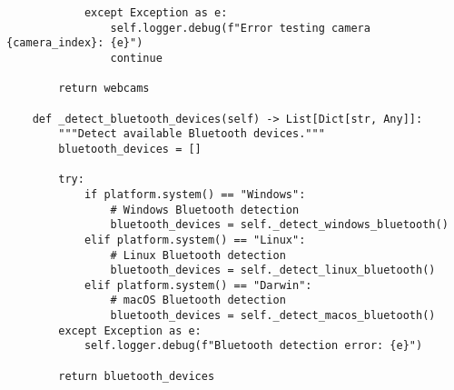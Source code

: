 \documentclass[12pt,a4paper]{article}
\begin{document}
\begin{verbatim}
            except Exception as e:
                self.logger.debug(f"Error testing camera {camera_index}: {e}")
                continue
        
        return webcams
    
    def _detect_bluetooth_devices(self) -> List[Dict[str, Any]]:
        """Detect available Bluetooth devices."""
        bluetooth_devices = []
        
        try:
            if platform.system() == "Windows":
                # Windows Bluetooth detection
                bluetooth_devices = self._detect_windows_bluetooth()
            elif platform.system() == "Linux":
                # Linux Bluetooth detection
                bluetooth_devices = self._detect_linux_bluetooth()
            elif platform.system() == "Darwin":
                # macOS Bluetooth detection
                bluetooth_devices = self._detect_macos_bluetooth()
        except Exception as e:
            self.logger.debug(f"Bluetooth detection error: {e}")
        
        return bluetooth_devices
    

\end{verbatim}
\end{document}

